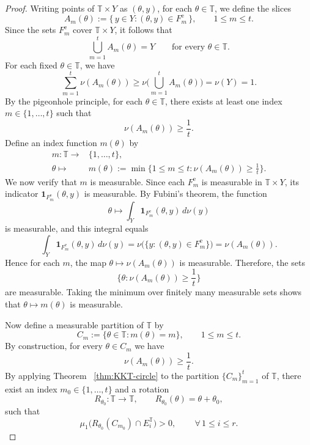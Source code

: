 \documentclass[11pt]{article}
\numberwithin{equation}{section}
\theoremstyle{remark}
\begin{document}
\begin{proof}
Writing points of $\mathbb{T}\times Y$ as $(\theta,y)$, for each $\theta\in \mathbb{T}$, we define the slices
\[
A_m(\theta) := \{\, y\in Y : (\theta,y)\in F_m^{\mathrm e}\,\}, \qquad 1\le m\le t.
\]
Since the sets $F_m^{\mathrm e}$ cover $\mathbb{T}\times Y$, it follows that
\[
\bigcup_{m=1}^t A_m(\theta) = Y
\qquad\text{for every } \theta\in \mathbb{T}.
\]
For each fixed $\theta\in \mathbb{T}$, we have
\[
    \sum_{m=1}^t \nu(A_m(\theta))
    \ge \nu\Big(\bigcup_{m=1}^t A_m(\theta)\Big)
    = \nu(Y)=1.
\]
By the pigeonhole principle, for each $\theta\in \mathbb{T}$, there exists at least one index $m\in\{1,\dots,t\}$ such that
\[
    \nu(A_m(\theta)) \ge \frac1t.
\]
Define an index function $m(\theta)$ by
\begin{align*}
    m: \mathbb{T} \to & \{1,\dots,t\},\\
    \theta \mapsto & m(\theta) := \min\Big\{1\le m\le t : \nu(A_m(\theta))\ge \frac1t\Big\}.
\end{align*}
We now verify that $m$ is measurable.
Since each $F_m^{\mathrm e}$ is measurable in $\mathbb{T}\times Y$, its indicator $\mathbf{1}_{F_m^{\mathrm e}}(\theta,y)$ is measurable. By Fubini's theorem, the function
\[
    \theta \mapsto \int_Y \mathbf{1}_{F_m^{\mathrm e}}(\theta,y)\,d\nu(y)
\]
is measurable, and this integral equals
\[
    \int_Y \mathbf{1}_{F_m^{\mathrm e}}(\theta,y)\,d\nu(y)
    = \nu\Big(\{y:(\theta,y)\in F_m^{\mathrm e}\}\Big)
    = \nu(A_m(\theta)).
\]
Hence for each $m$, the map $\theta\mapsto\nu(A_m(\theta))$ is measurable. Therefore, the sets
\[
    \bigg\{\theta : \nu(A_m(\theta))\ge \frac{1}{t} \bigg\}
\]
are measurable. Taking the minimum over finitely many measurable sets shows that $\theta\mapsto m(\theta)$ is measurable.

Now define a measurable partition of $\mathbb{T}$ by
\[
    C_m := \{\theta\in \mathbb{T}: m(\theta)=m\},\qquad 1\le m\le t.
\]
By construction, for every $\theta\in C_m$ we have
\begin{equation}\label{eq:Am-lower-bound}
    \nu(A_m(\theta))\ge \frac1t.
\end{equation}
By applying Theorem~ \ref{thm:KKT-circle} to the partition $\{C_m\}_{m=1}^t$ of $\mathbb{T}$, there exist an index $m_0\in\{1,\dots,t\}$ and a rotation
\[
    R_{\theta_0}: \mathbb{T} \to \mathbb{T},\qquad R_{\theta_0}(\theta)=\theta+\theta_0,
\]
such that
\begin{equation}\label{eq:KKT-circle-hit}
    \mu_1\big(R_{\theta_0}(C_{m_0})\cap E_i^\mathbb{T}\big)>0,
    \qquad\, \forall\, 1\le i\le r.
\end{equation}


\end{proof}
\end{document}

